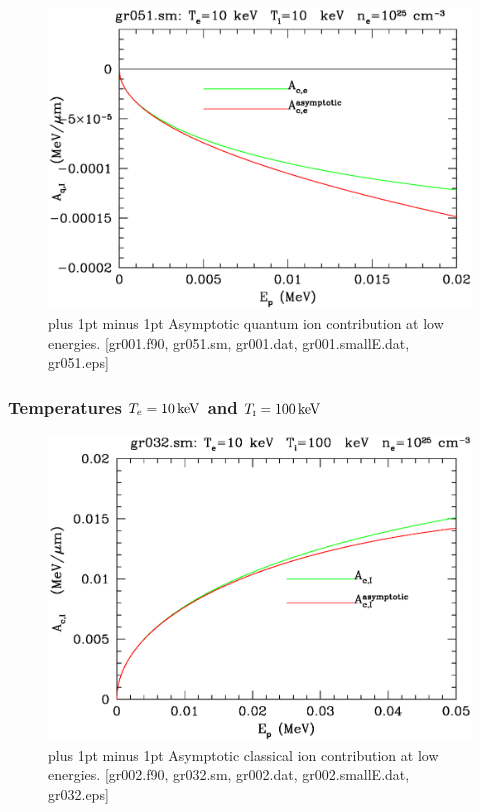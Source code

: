 \documentclass[preprint,12pt,eqsecnum,nofootinbib,amsmath,amssymb]{revtex4}
\newcommand{\smI}{{\rm\scriptscriptstyle I}}
\newcommand{\footnoteskip}{\baselineskip 12pt plus 1pt minus 1pt}
\begin{document}
\vskip-2.0cm 
\begin{figure}[h!]
\includegraphics[scale=0.45]{gr051.eps} 
\vskip-0.8cm 
\caption{\footnoteskip  
  Asymptotic quantum ion contribution at low energies. [gr001.f90,
  gr051.sm, gr001.dat, gr001.smallE.dat, gr051.eps]
}
\label{fig:gr051}
\end{figure}



\pagebreak
\subsubsection{Temperatures $T_e=10\,{\rm keV}$ and $T_\smI=100\,{\rm keV}$}

\vskip-2cm 
\begin{figure}[h!]
\includegraphics[scale=0.45]{gr032.eps} 
\vskip-0.8cm 
\caption{\footnoteskip  
  Asymptotic classical ion contribution at low energies. [gr002.f90,
  gr032.sm, gr002.dat, gr002.smallE.dat, gr032.eps]
}
\label{fig:gr032}
\end{figure}
\end{document}
